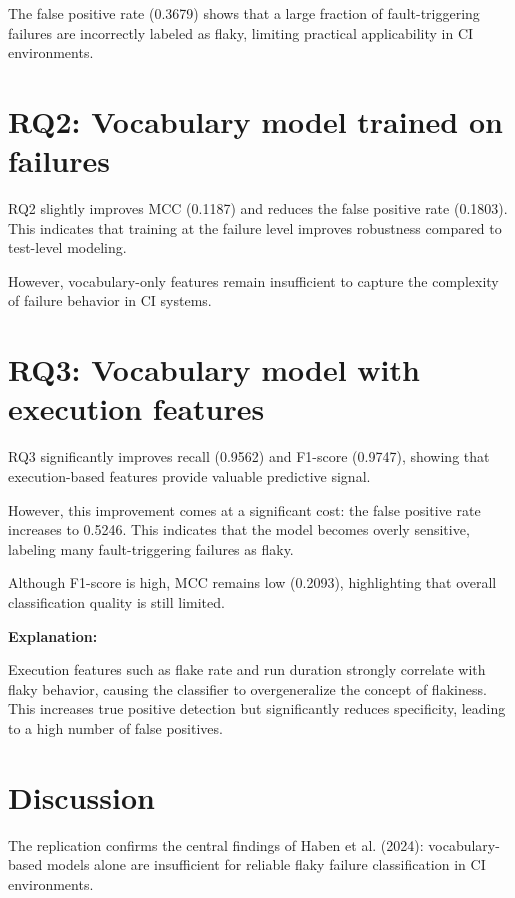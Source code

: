 \documentclass[pdflatex,sn-mathphys-num]{sn-jnl}
\begin{document}
The false positive rate (0.3679) shows that a large fraction of fault-triggering failures are incorrectly labeled as flaky, limiting practical applicability in CI environments.

\section{RQ2: Vocabulary model trained on failures}

RQ2 slightly improves MCC (0.1187) and reduces the false positive rate (0.1803). This indicates that training at the failure level improves robustness compared to test-level modeling.

However, vocabulary-only features remain insufficient to capture the complexity of failure behavior in CI systems.

\section{RQ3: Vocabulary model with execution features}

RQ3 significantly improves recall (0.9562) and F1-score (0.9747), showing that execution-based features provide valuable predictive signal.

However, this improvement comes at a significant cost: the false positive rate increases to 0.5246. This indicates that the model becomes overly sensitive, labeling many fault-triggering failures as flaky.

Although F1-score is high, MCC remains low (0.2093), highlighting that overall classification quality is still limited.

\textbf{Explanation:}

Execution features such as flake rate and run duration strongly correlate with flaky behavior, causing the classifier to overgeneralize the concept of flakiness. This increases true positive detection but significantly reduces specificity, leading to a high number of false positives.

\section{Discussion}

The replication confirms the central findings of Haben et al. (2024): vocabulary-based models alone are insufficient for reliable flaky failure classification in CI environments.
\end{document}
